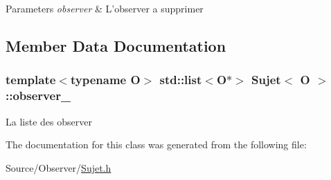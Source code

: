 \begin{DoxyParams}{Parameters}
{\em observer} & L'observer a supprimer \\
\hline
\end{DoxyParams}


\subsection{Member Data Documentation}
\hypertarget{classSujet_a12ee36985ce73e7d73e70da6fcf22e89}{
\subsubsection[{observer\-\_\-}]{\setlength{\rightskip}{0pt plus 5cm}template$<$typename O$>$ std\-::list$<$O$\ast$$>$ {\bf Sujet}$<$ O $>$\-::observer\-\_\-\hspace{0.3cm}{\ttfamily [protected]}}}\label{classSujet_a12ee36985ce73e7d73e70da6fcf22e89}
La liste des observer 

The documentation for this class was generated from the following file\-:\begin{DoxyCompactItemize}
\item 
Source/\-Observer/\hyperlink{Sujet_8h}{Sujet.\-h}\end{DoxyCompactItemize}
